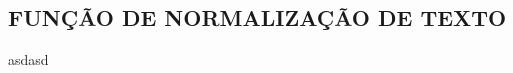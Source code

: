 \begin{apendicesenv}

\partapendices

\chapter{FUNÇÃO DE NORMALIZAÇÃO DE TEXTO}

asdasd


\end{apendicesenv}